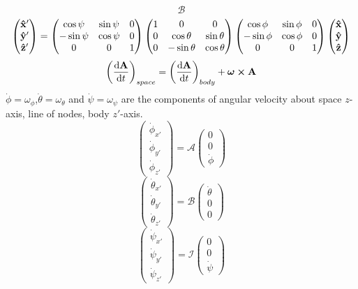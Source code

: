 \documentclass[12pt]{article}
\begin{document}
\[\mathcal{B}\]
\[
\begin{pmatrix}
\vu{x}'\\ \vu{y}'\\ \vu{z}'
\end{pmatrix}
=
\begin{pmatrix}
\cos\psi& \sin\psi& 0 \\
-\sin\psi& \cos\psi& 0 \\
0& 0& 1
\end{pmatrix}
\begin{pmatrix}
1& 0& 0 \\
0& \cos\theta& \sin\theta\\
0& -\sin\theta& \cos\theta
\end{pmatrix}
\begin{pmatrix}
\cos\phi& \sin\phi& 0\\
-\sin\phi& \cos\phi& 0\\
0& 0& 1
\end{pmatrix}
\begin{pmatrix}
\vu{x}\\ \vu{y}\\ \vu{z}
\end{pmatrix}
\]
\[\qty(\dv{\vb{A}}{t})_{space}=\qty(\dv{\vb{A}}{t})_{body}+\bm{\omega}\cp\vb{A}\]
$\dot{\phi}=\omega_{\phi}$,$\dot{\theta}=\omega_{\theta}$ and $\dot{\psi}=\omega_{\psi}$ are the components of angular velocity about space $z$-axis, line of nodes, body $z'$-axis.
\[
\begin{pmatrix}
\dot{\phi}_{x'}\\
\dot{\phi}_{y'}\\
\dot{\phi}_{z'}
\end{pmatrix}
=\mathcal{A}
\begin{pmatrix}
0\\0\\\dot{\phi}
\end{pmatrix}
\]
\[
\begin{pmatrix}
\dot{\theta}_{x'}\\
\dot{\theta}_{y'}\\
\dot{\theta}_{z'}
\end{pmatrix}
=\mathcal{B}
\begin{pmatrix}
\dot{\theta}\\0\\0
\end{pmatrix}
\]
\[
\begin{pmatrix}
\dot{\psi}_{x'}\\
\dot{\psi}_{y'}\\
\dot{\psi}_{z'}
\end{pmatrix}
=\mathcal{I}
\begin{pmatrix}
0\\0\\\dot{\psi}
\end{pmatrix}
\]
\end{document}
